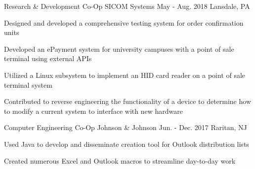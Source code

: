 \begin{cvexperiences}
	\cvexperience
		{Research \& Development Co-Op}
		{SICOM Systems}
		{May - Aug. 2018}
		{Lansdale, PA}
		{
			\begin{cvitems}
			\item {Designed and developed a comprehensive testing system for order confirmation units}
			\item {Developed an ePayment system for university campuses with a point of sale terminal using external APIs}
			\item {Utilized a Linux subsystem to implement an HID card reader on a point of sale terminal system}
			\item {Contributed to reverse engineering the functionality of a device to determine how to modify a current system to interface with new hardware}
			\end{cvitems}
		}

	\cvexperience
		{Computer Engineering Co-Op}
		{Johnson \& Johnson}
		{Jun. - Dec. 2017}
		{Raritan, NJ}
		{
			\begin{cvitems}
			\item {Used Java to develop and disseminate creation tool for Outlook distribution lists}
			\item {Created numerous Excel and Outlook macros to streamline day-to-day work}
			\end{cvitems}
		}

\end{cvexperiences}
